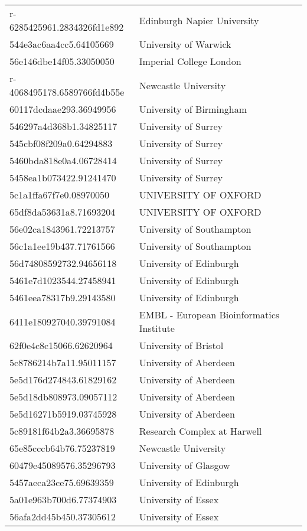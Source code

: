 \begin{tabular}{ll}
r-6285425961.2834326fd1e892 & Edinburgh Napier University \\
544e3ac6aa4cc5.64105669 & University of Warwick \\
56e146dbe14f05.33050050 & Imperial College London \\
r-4068495178.6589766fd4b55e & Newcastle University \\
60117dcdaae293.36949956 & University of Birmingham \\
546297a4d368b1.34825117 & University of Surrey \\
545cbf08f209a0.64294883 & University of Surrey \\
5460bda818e0a4.06728414 & University of Surrey \\
5458ea1b073422.91241470 & University of Surrey \\
5c1a1ffa67f7e0.08970050 & UNIVERSITY OF OXFORD \\
65df8da53631a8.71693204 & UNIVERSITY OF OXFORD \\
56e02ca1843961.72213757 & University of Southampton \\
56c1a1ee19b437.71761566 & University of Southampton \\
56d74808592732.94656118 & University of Edinburgh \\
5461e7d1023544.27458941 & University of Edinburgh \\
5461eea78317b9.29143580 & University of Edinburgh \\
6411e180927040.39791084 & EMBL - European Bioinformatics Institute \\
62f0e4c8c15066.62620964 & University of Bristol \\
5c8786214b7a11.95011157 & University of Aberdeen \\
5e5d176d274843.61829162 & University of Aberdeen \\
5e5d18db808973.09057112 & University of Aberdeen \\
5e5d16271b5919.03745928 & University of Aberdeen \\
5c89181f64b2a3.36695878 & Research Complex at Harwell \\
65e85cccb64b76.75237819 & Newcastle University \\
60479e45089576.35296793 & University of Glasgow \\
5457aeca23ce75.69639359 & University of Edinburgh \\
5a01e963b700d6.77374903 & University of Essex \\
56afa2dd45b450.37305612 & University of Essex \\

\end{tabular}
